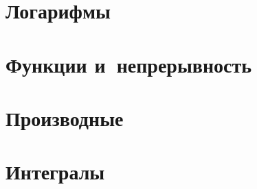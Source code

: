 \documentclass[]{scrartcl}
\begin{document}
\section{Логарифмы}
\section{Функции и~непрерывность}
\section{Производные}
\section{Интегралы}




\nocite{CSC:intro-in-matan}

\printbibliography[title=Источники информации]
\end{document}

